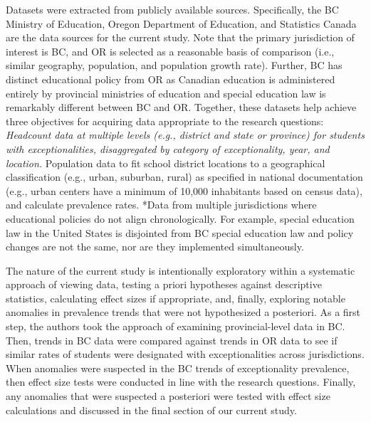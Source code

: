 \documentclass[
  english,
  man,floatsintext]{apa6}
\begin{document}
Datasets were extracted from publicly available sources. Specifically, the BC Ministry of Education, Oregon Department of Education, and Statistics Canada are the data sources for the current study. Note that the primary jurisdiction of interest is BC, and OR is selected as a reasonable basis of comparison (i.e., similar geography, population, and population growth rate). Further, BC has distinct educational policy from OR as Canadian education is administered entirely by provincial ministries of education and special education law is remarkably different between BC and OR. Together, these datasets help achieve three objectives for acquiring data appropriate to the research questions:
\emph{Headcount data at multiple levels (e.g., district and state or province) for students with exceptionalities, disaggregated by category of exceptionality, year, and location.
}Population data to fit school district locations to a geographical classification (e.g., urban, suburban, rural) as specified in national documentation (e.g., urban centers have a minimum of 10,000 inhabitants based on census data), and calculate prevalence rates.
*Data from multiple jurisdictions where educational policies do not align chronologically. For example, special education law in the United States is disjointed from BC special education law and policy changes are not the same, nor are they implemented simultaneously.

The nature of the current study is intentionally exploratory within a systematic approach of viewing data, testing a priori hypotheses against descriptive statistics, calculating effect sizes if appropriate, and, finally, exploring notable anomalies in prevalence trends that were not hypothesized a posteriori. As a first step, the authors took the approach of examining provincial-level data in BC. Then, trends in BC data were compared against trends in OR data to see if similar rates of students were designated with exceptionalities across jurisdictions. When anomalies were suspected in the BC trends of exceptionality prevalence, then effect size tests were conducted in line with the research questions. Finally, any anomalies that were suspected a posteriori were tested with effect size calculations and discussed in the final section of our current study.
\end{document}
